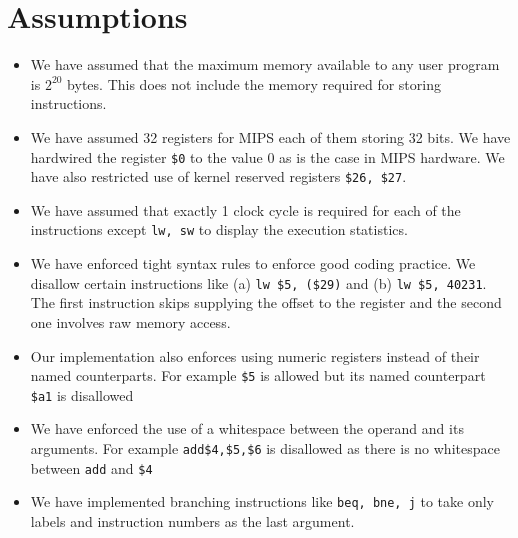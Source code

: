 \documentclass[hidelinks,12pt]{article}
\begin{document}
\section{Assumptions}
\begin{itemize}
    \item We have assumed that the maximum memory available to any user program is $2^{20}$ bytes. This does not include the memory required for storing instructions.
    \item We have assumed 32 registers for MIPS each of them storing 32 bits. We have hardwired the register \verb|$0| to the value $0$ as is the case in MIPS hardware. We have also restricted use of kernel reserved registers \verb|$26, $27|.
    \item We have assumed that exactly 1 clock cycle is required for each of the instructions except \verb|lw, sw| to display the execution statistics.
    \item We have enforced tight syntax rules to enforce good coding practice. We disallow certain instructions like (a) \verb|lw $5, ($29)| and (b) \verb|lw $5, 40231|.
          The first instruction skips supplying the offset to the register and the second one involves raw memory access.
    \item Our implementation also enforces using numeric registers instead of their named counterparts. For example \verb|$5| is allowed but its named counterpart \verb|$a1| is disallowed
    \item We have enforced the use of a whitespace between the operand and its arguments. For example \verb|add$4,$5,$6| is disallowed as there is no whitespace between \verb|add| and \verb|$4|
    \item We have implemented branching instructions like \verb|beq, bne, j| to take only labels and instruction numbers as the last argument.
\end{itemize}
\end{document}

